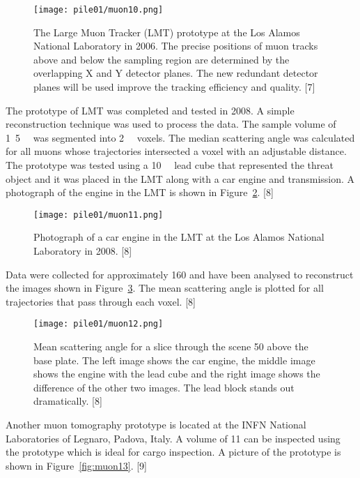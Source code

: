 \documentclass[twocolumn,a4paper]{article}
\begin{document}
\begin{figure}
  \texttt{[image: pile01/muon10.png]}
  \caption{The Large Muon Tracker (LMT) prototype at the Los Alamos
    National Laboratory in 2006.  The precise positions of muon tracks
    above and below the sampling region are determined by the
    overlapping X and Y detector planes. The new redundant detector
    planes will be used improve the tracking efficiency and
    quality. [7]}
  \label{fig:muon10}
\end{figure}

The prototype of LMT was completed and tested in 2008. A simple
reconstruction technique was used to process the data. The sample
volume of \unit{1.5}{\cubic\metre} was segmented
into \unit{2}{\cubic{\centi\metre}} voxels. The median
scattering angle was calculated for all muons whose trajectories
intersected a voxel with an adjustable distance. The prototype was
tested using a \unit{10}{\cubic{\centi\metre}} lead
cube that represented the threat object and it was placed in the LMT
along with a car engine and transmission.  A photograph of the engine
in the LMT is shown in Figure~\ref{fig:muon11}. [8]

\begin{figure}
  \texttt{[image: pile01/muon11.png]}
  \caption{Photograph of a car engine in the LMT at the Los Alamos
    National Laboratory in 2008. [8]}
  \label{fig:muon11}
\end{figure}

Data were collected for approximately \unit{160}{\minute} and have
been analysed to reconstruct the images shown in
Figure~\ref{fig:muon12}. The mean scattering angle is plotted for all
trajectories that pass through each voxel. [8]

\begin{figure}
  \texttt{[image: pile01/muon12.png]}
  \caption{Mean scattering angle for a slice through the scene
    \unit{50}{\centi\metre} above the base plate. The left image shows
    the car engine, the middle image shows the engine with the lead
    cube and the right image shows the difference of the other two
    images. The lead block stands out dramatically. [8]}
  \label{fig:muon12}
\end{figure}

Another muon tomography prototype is located at the INFN National
Laboratories of Legnaro, Padova, Italy. A volume of
\unit{11}{\cubic\metre} can be inspected using the prototype which is
ideal for cargo inspection. A picture of the prototype is shown in
Figure~\ref{fig:muon13}. [9]
\end{document}
